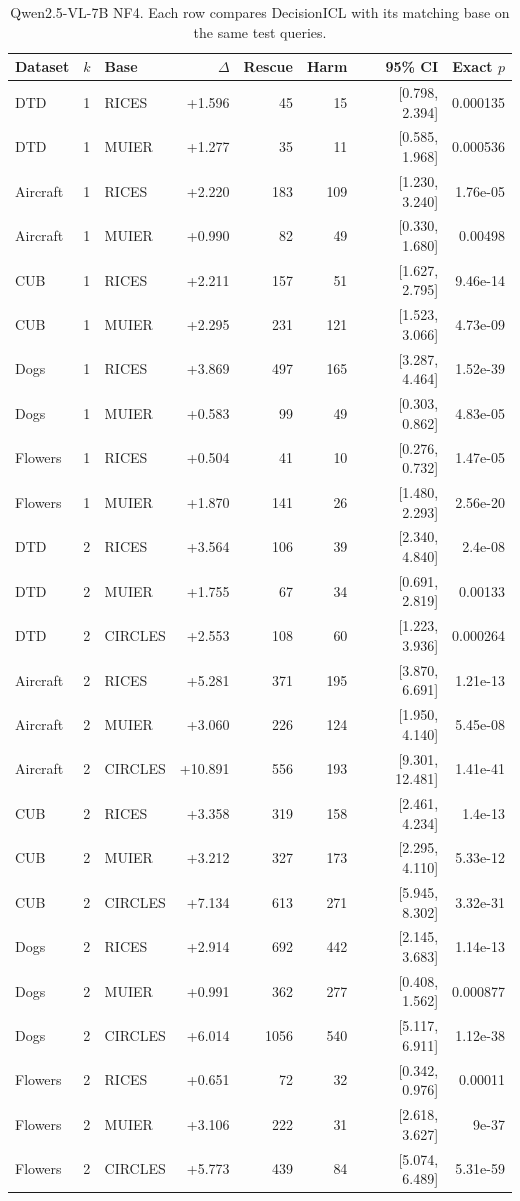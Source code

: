 \documentclass[10pt,twocolumn,letterpaper]{article}
\newcommand{\method}{DecisionICL\xspace}
\begin{document}
\begin{table}[t]
\caption{Qwen2.5-VL-7B NF4. Each row compares \method with its matching base on the same test queries.}
\label{sup:paired_1}
\centering\small
\begin{tabular}{lllrrrrr}
\toprule
Dataset & $k$ & Base & $\Delta$ & Rescue & Harm & 95\% CI & Exact $p$ \\
\midrule
DTD & 1 & RICES & +1.596 & 45 & 15 & [0.798, 2.394] & 0.000135 \\
DTD & 1 & MUIER & +1.277 & 35 & 11 & [0.585, 1.968] & 0.000536 \\
Aircraft & 1 & RICES & +2.220 & 183 & 109 & [1.230, 3.240] & 1.76e-05 \\
Aircraft & 1 & MUIER & +0.990 & 82 & 49 & [0.330, 1.680] & 0.00498 \\
CUB & 1 & RICES & +2.211 & 157 & 51 & [1.627, 2.795] & 9.46e-14 \\
CUB & 1 & MUIER & +2.295 & 231 & 121 & [1.523, 3.066] & 4.73e-09 \\
Dogs & 1 & RICES & +3.869 & 497 & 165 & [3.287, 4.464] & 1.52e-39 \\
Dogs & 1 & MUIER & +0.583 & 99 & 49 & [0.303, 0.862] & 4.83e-05 \\
Flowers & 1 & RICES & +0.504 & 41 & 10 & [0.276, 0.732] & 1.47e-05 \\
Flowers & 1 & MUIER & +1.870 & 141 & 26 & [1.480, 2.293] & 2.56e-20 \\
DTD & 2 & RICES & +3.564 & 106 & 39 & [2.340, 4.840] & 2.4e-08 \\
DTD & 2 & MUIER & +1.755 & 67 & 34 & [0.691, 2.819] & 0.00133 \\
DTD & 2 & CIRCLES & +2.553 & 108 & 60 & [1.223, 3.936] & 0.000264 \\
Aircraft & 2 & RICES & +5.281 & 371 & 195 & [3.870, 6.691] & 1.21e-13 \\
Aircraft & 2 & MUIER & +3.060 & 226 & 124 & [1.950, 4.140] & 5.45e-08 \\
Aircraft & 2 & CIRCLES & +10.891 & 556 & 193 & [9.301, 12.481] & 1.41e-41 \\
CUB & 2 & RICES & +3.358 & 319 & 158 & [2.461, 4.234] & 1.4e-13 \\
CUB & 2 & MUIER & +3.212 & 327 & 173 & [2.295, 4.110] & 5.33e-12 \\
CUB & 2 & CIRCLES & +7.134 & 613 & 271 & [5.945, 8.302] & 3.32e-31 \\
Dogs & 2 & RICES & +2.914 & 692 & 442 & [2.145, 3.683] & 1.14e-13 \\
Dogs & 2 & MUIER & +0.991 & 362 & 277 & [0.408, 1.562] & 0.000877 \\
Dogs & 2 & CIRCLES & +6.014 & 1056 & 540 & [5.117, 6.911] & 1.12e-38 \\
Flowers & 2 & RICES & +0.651 & 72 & 32 & [0.342, 0.976] & 0.00011 \\
Flowers & 2 & MUIER & +3.106 & 222 & 31 & [2.618, 3.627] & 9e-37 \\
Flowers & 2 & CIRCLES & +5.773 & 439 & 84 & [5.074, 6.489] & 5.31e-59 \\
\bottomrule
\end{tabular}
\end{table}
\end{document}
